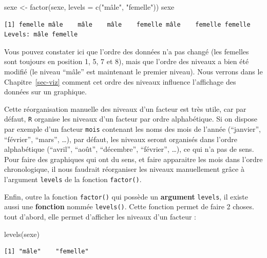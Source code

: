 \documentclass[
  a4paper,
  DIV=11,
  numbers=noendperiod,
  oneside]{scrreprt}
\newenvironment{Shaded}{}{}
\newcommand{\AttributeTok}[1]{\textcolor[rgb]{0.84,0.23,0.29}{#1}}
\newcommand{\FunctionTok}[1]{\textcolor[rgb]{0.44,0.26,0.76}{#1}}
\newcommand{\NormalTok}[1]{\textcolor[rgb]{0.14,0.16,0.18}{#1}}
\newcommand{\OtherTok}[1]{\textcolor[rgb]{0.44,0.26,0.76}{#1}}
\newcommand{\StringTok}[1]{\textcolor[rgb]{0.01,0.18,0.38}{#1}}
\begin{document}
\begin{Shaded}
\begin{Highlighting}[]
\NormalTok{sexe }\OtherTok{\textless{}{-}} \FunctionTok{factor}\NormalTok{(sexe, }\AttributeTok{levels =} \FunctionTok{c}\NormalTok{(}\StringTok{"mâle"}\NormalTok{, }\StringTok{"femelle"}\NormalTok{))}
\NormalTok{sexe}
\end{Highlighting}
\end{Shaded}

\begin{verbatim}
[1] femelle mâle    mâle    mâle    femelle mâle    femelle femelle
Levels: mâle femelle
\end{verbatim}

Vous pouvez constater ici que l'ordre des données n'a pas changé (les
femelles sont toujours en position 1, 5, 7 et 8), mais que l'ordre des
niveaux a bien été modifié (le niveau ``mâle'' est maintenant le premier
niveau). Nous verrons dans le Chapitre~\ref{sec-viz} comment cet ordre
des niveaux influence l'affichage des données sur un graphique.

Cette réorganisation manuelle des niveaux d'un facteur est très utile,
car par défaut, \texttt{R} organise les niveaux d'un facteur par ordre
alphabétique. Si on dispose par exemple d'un facteur \texttt{mois}
contenant les noms des mois de l'année (``janvier'', ``février'',
``mars'', \ldots), par défaut, les niveaux seront organisés dans l'ordre
alphabétique (``avril'', ``août'', ``décembre'', ``février'', \ldots),
ce qui n'a pas de sens. Pour faire des graphiques qui ont du sens, et
faire apparaitre les mois dans l'ordre chronologique, il nous faudrait
réorganiser les niveaux manuellement grâce à l'argument \texttt{levels}
de la fonction \texttt{factor()}.

Enfin, outre la fonction \texttt{factor()} qui possède un
\textbf{argument} \texttt{levels}, il existe aussi une \textbf{fonction}
nommée \texttt{levels()}. Cette fonction permet de faire 2 choses. tout
d'abord, elle permet d'afficher les niveaux d'un facteur :

\begin{Shaded}
\begin{Highlighting}[]
\FunctionTok{levels}\NormalTok{(sexe)}
\end{Highlighting}
\end{Shaded}

\begin{verbatim}
[1] "mâle"    "femelle"
\end{verbatim}
\end{document}
